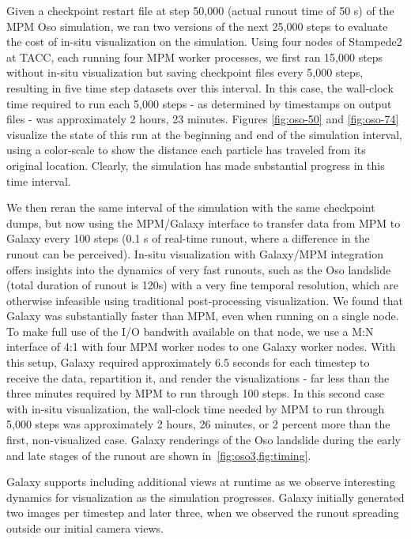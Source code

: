 \documentclass[journal]{IEEEtran}
\begin{document}
Given a checkpoint restart file at step 50,000 (actual runout time of 50 s) of the MPM Oso simulation, we ran two versions of the next 25,000 steps to evaluate the cost of in-situ visualization on the simulation.   Using four nodes of Stampede2 at TACC, each running four MPM worker processes, we first ran 15,000 steps without in-situ visualization but saving checkpoint files every 5,000 steps, resulting in five time step datasets over this interval. In this case, the wall-clock time required to run each 5,000 steps - as determined by timestamps on output files - was approximately 2 hours, 23 minutes.   Figures \ref{fig:oso-50} and \ref{fig:oso-74} visualize the state of this run at the beginning and end of the simulation interval, using a color-scale to show the distance each particle has traveled from its original location.  Clearly, the simulation has made substantial progress in this time interval.

We then reran the same interval of the simulation with the same checkpoint dumps, but now using the MPM/Galaxy interface to transfer data from MPM to Galaxy every 100 steps (0.1 s of real-time runout, where a difference in the runout can be perceived).  In-situ visualization with Galaxy/MPM integration offers insights into the dynamics of very fast runouts, such as the Oso landslide (total duration of runout is 120s) with a very fine temporal resolution, which are otherwise infeasible using traditional post-processing visualization. We found that Galaxy was substantially faster than MPM, even when running on a single node.  To make full use of the I/O bandwith available on that node, we use a M:N interface of 4:1 with four MPM worker nodes to one Galaxy worker nodes.  With this setup, Galaxy required approximately 6.5 seconds for each timestep to receive the data, repartition it, and render the visualizations - far less than the three minutes required by MPM to run through 100 steps.   In this second case with in-situ visualization, the wall-clock time needed by MPM to run through 5,000 steps was approximately 2 hours, 26 minutes, or 2 percent more than the first, non-visualized case.  Galaxy renderings of the Oso landslide during the early and late stages of the runout are shown in~\cref{fig:oso3,fig:timing}.


Galaxy supports including additional views at runtime as we observe interesting dynamics for visualization as the simulation progresses.  Galaxy initially generated two images per timestep and later three, when we observed the runout spreading outside our initial camera views.  
\end{document}
